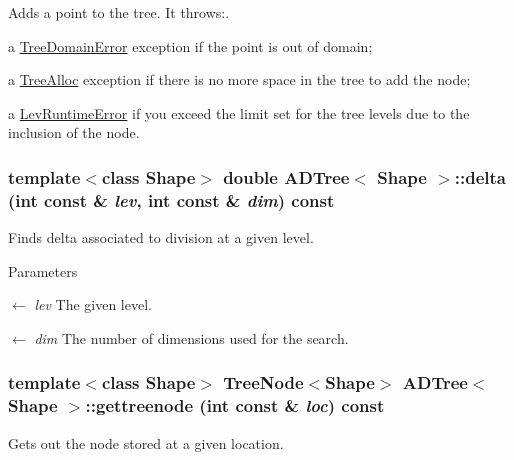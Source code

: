 Adds a point to the tree. It throws:. 
\begin{DoxyItemize}
\item a \hyperlink{classTreeDomainError}{TreeDomainError} exception if the point is out of domain; 
\item a \hyperlink{classTreeAlloc}{TreeAlloc} exception if there is no more space in the tree to add the node; 
\item a \hyperlink{classLevRuntimeError}{LevRuntimeError} if you exceed the limit set for the tree levels due to the inclusion of the node. 
\end{DoxyItemize}\hypertarget{classADTree_a70bf34ef5fddca65b241e9e296e26021}{
\subsubsection[{delta}]{\setlength{\rightskip}{0pt plus 5cm}template$<$class Shape$>$ double {\bf ADTree}$<$ Shape $>$::delta (int const \& {\em lev}, \/  int const \& {\em dim}) const}}
\label{classADTree_a70bf34ef5fddca65b241e9e296e26021}
Finds delta associated to division at a given level.


\begin{DoxyParams}{Parameters}
\item[\mbox{$\leftarrow$} {\em lev}]The given level. \item[\mbox{$\leftarrow$} {\em dim}]The number of dimensions used for the search. \end{DoxyParams}
\hypertarget{classADTree_a4dd7574cdb137f38611311083294a365}{
\subsubsection[{gettreenode}]{\setlength{\rightskip}{0pt plus 5cm}template$<$class Shape$>$ {\bf TreeNode}$<$Shape$>$ {\bf ADTree}$<$ Shape $>$::gettreenode (int const \& {\em loc}) const}}
\label{classADTree_a4dd7574cdb137f38611311083294a365}
Gets out the node stored at a given location.


